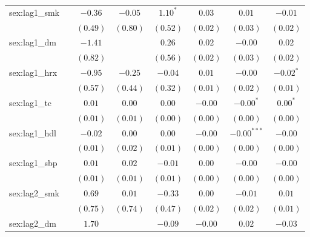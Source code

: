 \begin{tabular}{l c c c c c c c}
sex:lag1\_smk        &               & $-0.36$       & $-0.05$     & $1.10^{*}$    & $0.03$        & $0.01$        & $-0.01$       \\
                     &               & $(0.49)$      & $(0.80)$    & $(0.52)$      & $(0.02)$      & $(0.03)$      & $(0.02)$      \\
sex:lag1\_dm         &               & $-1.41$       &             & $0.26$        & $0.02$        & $-0.00$       & $0.02$        \\
                     &               & $(0.82)$      &             & $(0.56)$      & $(0.02)$      & $(0.03)$      & $(0.02)$      \\
sex:lag1\_hrx        &               & $-0.95$       & $-0.25$     & $-0.04$       & $0.01$        & $-0.00$       & $-0.02^{*}$   \\
                     &               & $(0.57)$      & $(0.44)$    & $(0.32)$      & $(0.01)$      & $(0.02)$      & $(0.01)$      \\
sex:lag1\_tc         &               & $0.01$        & $0.00$      & $0.00$        & $-0.00$       & $-0.00^{*}$   & $0.00^{*}$    \\
                     &               & $(0.01)$      & $(0.01)$    & $(0.00)$      & $(0.00)$      & $(0.00)$      & $(0.00)$      \\
sex:lag1\_hdl        &               & $-0.02$       & $0.00$      & $0.00$        & $-0.00$       & $-0.00^{***}$ & $-0.00$       \\
                     &               & $(0.01)$      & $(0.02)$    & $(0.01)$      & $(0.00)$      & $(0.00)$      & $(0.00)$      \\
sex:lag1\_sbp        &               & $0.01$        & $0.02$      & $-0.01$       & $0.00$        & $-0.00$       & $-0.00$       \\
                     &               & $(0.01)$      & $(0.01)$    & $(0.01)$      & $(0.00)$      & $(0.00)$      & $(0.00)$      \\
sex:lag2\_smk        &               & $0.69$        & $0.01$      & $-0.33$       & $0.00$        & $-0.01$       & $0.01$        \\
                     &               & $(0.75)$      & $(0.74)$    & $(0.47)$      & $(0.02)$      & $(0.02)$      & $(0.01)$      \\
sex:lag2\_dm         &               & $1.70$        &             & $-0.09$       & $-0.00$       & $0.02$        & $-0.03$       \\

\end{tabular}
